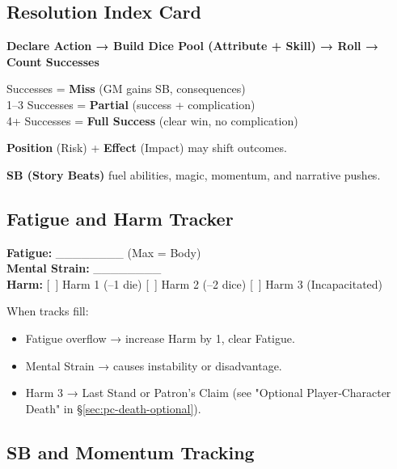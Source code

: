 \subsection{Resolution Index Card}

\begin{tcolorbox}[colback=white,colframe=black,left=1em,right=1em,top=0.5em,bottom=0.5em]
\textbf{Declare Action → Build Dice Pool (Attribute + Skill) → Roll → Count Successes}

 Successes = \textbf{Miss} (GM gains SB, consequences) \\
1--3 Successes = \textbf{Partial} (success + complication) \\
4+ Successes = \textbf{Full Success} (clear win, no complication)

\smallskip
\textbf{Position} (Risk) + \textbf{Effect} (Impact) may shift outcomes.

\smallskip
\textbf{SB (Story Beats)} fuel abilities, magic, momentum, and narrative pushes.
\end{tcolorbox}

\subsection{Fatigue and Harm Tracker}

\begin{tcolorbox}[colback=white,colframe=black,left=1em,right=1em,top=0.5em,bottom=0.5em]
\textbf{Fatigue:} \_\_\_\_\_\_\_\_  (Max = Body) \\
\textbf{Mental Strain:} \_\_\_\_\_\_\_\_ \\
\textbf{Harm:} [~] Harm 1 (--1 die) [~] Harm 2 (--2 dice) [~] Harm 3 (Incapacitated)

\medskip
When tracks fill:
\begin{itemize}
    \item Fatigue overflow → increase Harm by 1, clear Fatigue.
    \item Mental Strain → causes instability or disadvantage.
    \item Harm 3 → Last Stand or Patron's Claim (see "Optional Player‑Character Death" in \S\ref{sec:pc-death-optional}).
\end{itemize}
\end{tcolorbox}

\subsection{SB and Momentum Tracking}

